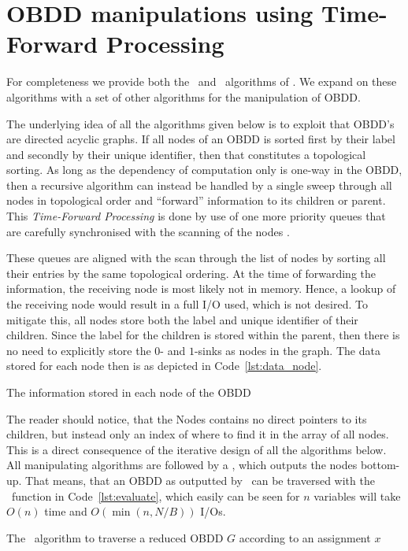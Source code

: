 \newpage
\section{OBDD manipulations using Time-Forward Processing} \label{sec:theory}

For completeness we provide both the \Reduce\ and \Apply\ algorithms of
\cite{Arge96}. We expand on these algorithms with a set of other algorithms for
the manipulation of OBDD.

The underlying idea of all the algorithms given below is to exploit that OBDD's
are directed acyclic graphs. If all nodes of an OBDD is sorted first by their
label and secondly by their unique identifier, then that constitutes a
topological sorting. As long as the dependency of computation only is one-way in
the OBDD, then a recursive algorithm can instead be handled by a single sweep
through all nodes in topological order and ``forward'' information to its
children or parent. This \emph{Time-Forward Processing} is done by use of one
more priority queues that are carefully synchronised with the scanning of the
nodes \todocite.

These queues are aligned with the scan through the list of nodes by sorting all
their entries by the same topological ordering. At the time of forwarding the
information, the receiving node is most likely not in memory. Hence, a lookup of
the receiving node would result in a full I/O used, which is not desired. To
mitigate this, all nodes store both the label and unique identifier of their
children. Since the label for the children is stored within the parent, then
there is no need to explicitly store the $0$- and $1$-sinks as nodes in the
graph. The data stored for each node then is as depicted in
Code~\ref{lst:data_node}.
\begin{lstfloat}[ht!]
  \centering

  

  \caption{The information stored in each node of the OBDD}
  \label{lst:data_node}
\end{lstfloat}

The reader should notice, that the Nodes contains no direct pointers to its
children, but instead only an index of where to find it in the array of all
nodes. This is a direct consequence of the iterative design of all the
algorithms below. All manipulating algorithms are followed by a \Reduce, which
outputs the nodes bottom-up. That means, that an OBDD as outputted by \Reduce\
can be traversed with the \Evaluate\ function in Code~\ref{lst:evaluate}, which
easily can be seen for $n$ variables will take $O(n)$ time and $O(\min(n, N/B))$
I/Os.
\begin{lstfloat}[ht!]
  \centering

  

  \caption{The \Evaluate\ algorithm to traverse a reduced OBDD $G$ according to an
    assignment $x$}
  \label{lst:evaluate}
\end{lstfloat}

